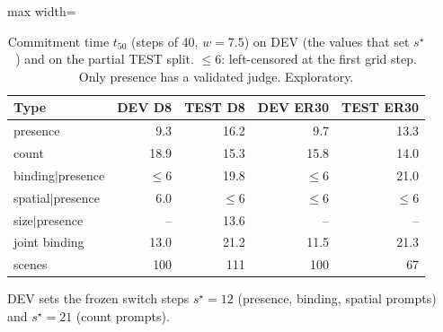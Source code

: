 \begin{table}[t]\centering\small
\caption{Commitment time $t_{50}$ (steps of 40, $w = 7.5$) on DEV (the values that set $s^\star$) and on the partial TEST split. $\le6$: left-censored at the first grid step. Only presence has a validated judge. Exploratory.}\label{tab:dev-vs-test}
\begin{adjustbox}{max width=\linewidth}\begin{tabular}{lrrrr}
\toprule
Type & DEV D8 & TEST D8 & DEV ER30 & TEST ER30 \\
\midrule
presence & 9.3 & 16.2 & 9.7 & 13.3 \\
count & 18.9 & 15.3 & 15.8 & 14.0 \\
binding$\mid$presence & $\le6$ & 19.8 & $\le6$ & 21.0 \\
spatial$\mid$presence & 6.0 & $\le6$ & $\le6$ & $\le6$ \\
size$\mid$presence & -- & 13.6 & -- & -- \\
joint binding & 13.0 & 21.2 & 11.5 & 21.3 \\
scenes & 100 & 111 & 100 & 67 \\
\bottomrule
\end{tabular}\end{adjustbox}
\par\smallskip\footnotesize DEV sets the frozen switch steps $s^\star = 12$ (presence, binding, spatial prompts) and $s^\star = 21$ (count prompts).
\end{table}
